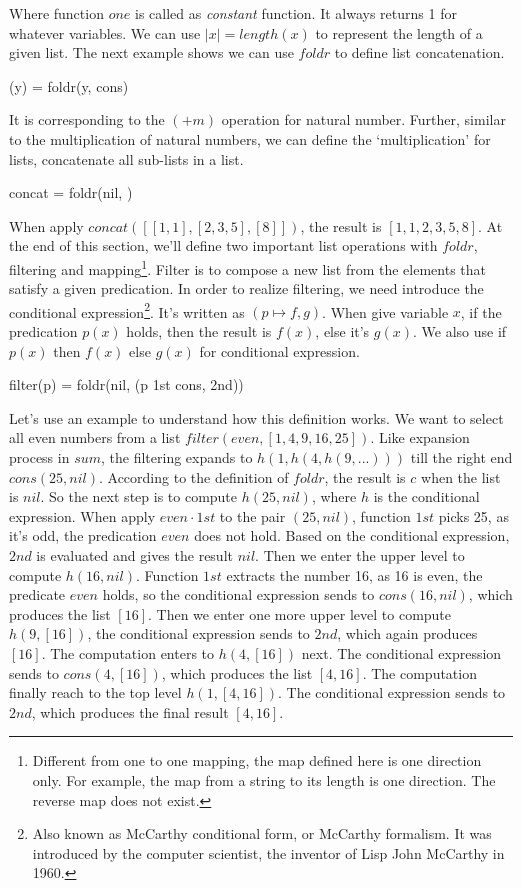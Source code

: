 \documentclass[UTF8]{article}
\begin{document}
Where function $one$ is called as {\em constant} function. It always returns 1 for whatever variables. We can use $|x| = length(x)$ to represent the length of a given list. The next example shows we can use $foldr$ to define list concatenation.

\be
(\doubleplus y) = foldr(y, cons)
\ee

It is corresponding to the $(+m)$ operation for natural number. Further, similar to the multiplication of natural numbers, we can define the `multiplication' for lists, concatenate all sub-lists in a list.

\be
concat = foldr(nil, \doubleplus)
\ee

When apply $concat([[1, 1], [2, 3, 5], [8]])$, the result is $[1, 1, 2, 3, 5, 8]$. At the end of this section, we'll define two important list operations with $foldr$, filtering and mapping\footnote{Different from one to one mapping, the map defined here is one direction only. For example, the map from a string to its length is one direction. The reverse map does not exist.}. Filter is to compose a new list from the elements that satisfy a given predication. In order to realize filtering, we need introduce the conditional expression\footnote{Also known as McCarthy conditional form, or McCarthy formalism. It was introduced by the computer scientist, the inventor of Lisp John McCarthy in 1960.}. It's written as $(p \mapsto f, g)$. When give variable $x$, if the predication $p(x)$ holds, then the result is $f(x)$, else it's $g(x)$. We also use if $p(x)$ then $f(x)$ else $g(x)$ for conditional expression.

\be
filter(p) = foldr(nil, (p \cdot 1st \mapsto cons, 2nd))
\ee

Let's use an example to understand how this definition works. We want to select all even numbers from a list $filter(even, [1, 4, 9, 16, 25])$. Like expansion process in $sum$, the filtering expands to $h(1, h(4, h(9, ...)))$ till the right end $cons(25, nil)$. According to the definition of $foldr$, the result is $c$ when the list is $nil$. So the next step is to compute $h(25, nil)$, where $h$ is the conditional expression. When apply $even \cdot 1st$ to the pair $(25, nil)$, function $1st$ picks 25, as it's odd, the predication $even$ does not hold. Based on the conditional expression, $2nd$ is evaluated and gives the result $nil$. Then we enter the upper level to compute $h(16, nil)$. Function $1st$ extracts the number 16, as 16 is even, the predicate $even$ holds, so the conditional expression sends to $cons(16, nil)$, which produces the list $[16]$. Then we enter one more upper level to compute $h(9, [16])$, the conditional expression sends to $2nd$, which again produces $[16]$. The computation enters to $h(4, [16])$ next. The conditional expression sends to $cons(4, [16])$, which produces the list $[4, 16]$. The computation finally reach to the top level $h(1, [4, 16])$. The conditional expression sends to $2nd$, which produces the final result $[4, 16]$.
\end{document}

